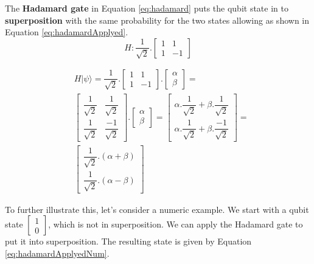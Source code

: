 		
			\par The \textbf{Hadamard gate} in Equation \ref{eq:hadamard} puts the qubit state in to \textbf{superposition} \cite{qcfcs}  with the same probability for the two states \cite{da2018introduccao} allowing as shown in Equation \ref{eq:hadamardApplyed}.
			\begin{equation}
				\label{eq:hadamard}
				H : \dfrac{1}{\sqrt{2}}.
				\begin{bmatrix}
					1& 1 \\
					1& -1
				\end{bmatrix}
			\end{equation}
			
			\begin{equation}
				\label{eq:hadamardApplyed}
				\begin{aligned}
					&H|\psi\rangle = \dfrac{1}{\sqrt{2}}.\begin{bmatrix}
						1& 1 \\
						1& -1
					\end{bmatrix} . \begin{bmatrix}
						\alpha \\
						\beta
					\end{bmatrix} = \\
					&\begin{bmatrix}
						\dfrac{1}{\sqrt{2}} &\dfrac{1}{\sqrt{2}} \\
						\dfrac{1}{\sqrt{2}} &\dfrac{-1}{\sqrt{2}}
					\end{bmatrix} .
					\begin{bmatrix}
						\alpha \\
						\beta
					\end{bmatrix} = 
					\begin{bmatrix}
						\alpha . \dfrac{1}{\sqrt{2}} + \beta.\dfrac{1}{\sqrt{2}} \\
						\alpha . \dfrac{1}{\sqrt{2}} + \beta.\dfrac{-1}{\sqrt{2}}
					\end{bmatrix} = \\
					&\begin{bmatrix}
						\dfrac{1}{\sqrt{2}} . (\alpha + \beta) \\
						\dfrac{1}{\sqrt{2}} . (\alpha - \beta)
					\end{bmatrix}
				\end{aligned}
			\end{equation}
		
			\par To further illustrate this, let's consider a numeric example. We start with a qubit state $\begin{bmatrix} 1 \\ 0 \end{bmatrix}$, which is not in superposition. We can apply the Hadamard gate to put it into superposition. The resulting state is given by Equation \ref{eq:hadamardApplyedNum}.
			
